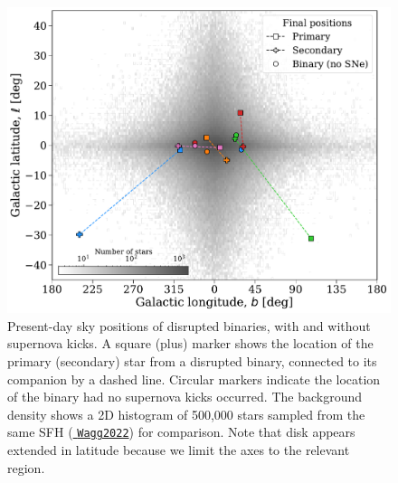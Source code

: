 \documentclass[twocolumn, twocolappendix, oneside, linenumbers]{aastex631}
\newcommand{\codeLink}[2]{{\href{https://cogsworth.readthedocs.io/en/latest/api/cogsworth.#2.#1.html}{\color{codecolour} \texttt{#1}}}}
\begin{document}
\begin{figure}
    \centering
    \includegraphics[width=\columnwidth]{figures/galactic_positions.pdf}
    \caption{Present-day sky positions of disrupted binaries, with and without supernova kicks. A square (plus) marker shows the location of the primary (secondary) star from a disrupted binary, connected to its companion by a dashed line. Circular markers indicate the location of the binary had no supernova kicks occurred. The background density shows a 2D histogram of 500,000 stars sampled from the same SFH (\codeLink{Wagg2022}{sfh}) for comparison. Note that disk appears extended in latitude because we limit the axes to the relevant region.}
    \label{fig:disrupted_pairs}
\end{figure}
\end{document}

